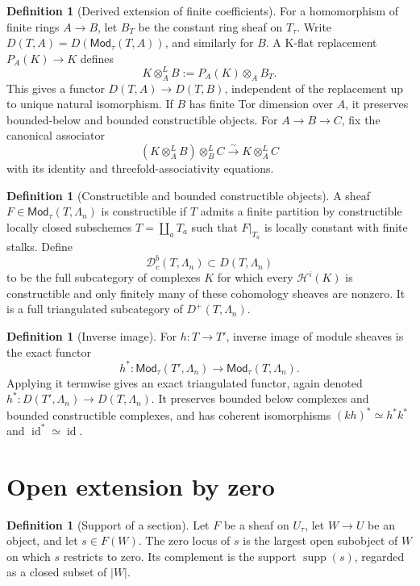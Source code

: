 \documentclass[10pt]{article}
\theoremstyle{definition}
\newtheorem{definition}[theorem]{Definition}
\newcommand{\Dbc}{\mathcal D^b_c}
\newcommand{\Mod}{\mathsf{Mod}}
\begin{document}
\begin{definition}[Derived extension of finite coefficients]
For a homomorphism of finite rings \(A\to B\), let \(B_T\) be the constant
ring sheaf on \(T_\tau\).  Write
\(D(T,A)=D(\Mod_\tau(T,A))\), and similarly for \(B\).  A K-flat
replacement \(P_A(K)\to K\) defines
\[
 K\otimes_A^LB:=P_A(K)\otimes_AB_T.
\]
This gives a functor \(D(T,A)\to D(T,B)\), independent of the replacement up to unique natural
isomorphism.  If \(B\) has finite Tor dimension over \(A\), it preserves
bounded-below and bounded constructible objects.  For
\(A\to B\to C\), fix the canonical associator
\[
 (K\otimes_A^LB)\otimes_B^LC
 \xrightarrow{\sim}K\otimes_A^LC
\]
with its identity and threefold-associativity equations.
\end{definition}

\begin{definition}[Constructible and bounded constructible objects]
A sheaf \(F\in\Mod_\tau(T,\Lambda_n)\) is constructible if \(T\) admits a
finite partition by constructible locally closed subschemes
\(T=\coprod_a T_a\) such that \(F|_{T_a}\) is locally constant with finite
stalks.  Define
\[
 \Dbc(T,\Lambda_n)\subset D(T,\Lambda_n)
\]
to be the full subcategory of complexes \(K\) for which every
\(\mathcal H^i(K)\) is constructible and only finitely many of these
cohomology sheaves are nonzero.  It is a full triangulated subcategory of
\(D^+(T,\Lambda_n)\).
\end{definition}

\begin{definition}[Inverse image]
For \(h:T\to T'\), inverse image of module sheaves is the exact functor
\[
 h^*:\Mod_\tau(T',\Lambda_n)\longrightarrow
 \Mod_\tau(T,\Lambda_n).
\]
Applying it termwise gives an exact triangulated functor, again denoted
\(h^*:D(T',\Lambda_n)\to D(T,\Lambda_n)\).  It preserves bounded
below complexes and bounded constructible complexes, and has coherent isomorphisms
\((kh)^*\simeq h^*k^*\) and \(\operatorname{id}^*\simeq\operatorname{id}\).
\end{definition}

\section{Open extension by zero}

\begin{definition}[Support of a section]
Let \(F\) be a sheaf on \(U_\tau\), let \(W\to U\) be an object, and let
\(s\in F(W)\).  The zero locus of \(s\) is the largest open subobject of
\(W\) on which \(s\) restricts to zero.  Its complement is the support
\(\operatorname{supp}(s)\), regarded as a closed subset of \(|W|\).
\end{definition}
\end{document}
